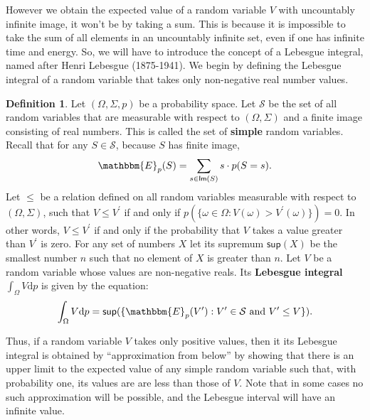 \documentclass[11pt]{article}
\theoremstyle{definition}
\newtheorem{definition}[theorem]{Definition}
\theoremstyle{remark}
\begin{document}
However we obtain the expected value of a random variable $V$ with uncountably infinite image, it won't be by taking a sum. This is because it is impossible to take the sum of all elements in an uncountably infinite set, even if one has infinite time and energy. So, we will have to introduce the concept of a Lebesgue integral, named after Henri Lebesgue (1875-1941). We begin by defining the Lebesgue integral of a random variable that takes only non-negative real number values.
\begin{definition}
    Let $(\Omega,\Sigma,p)$ be a probability space. Let $\mathcal{S}$ be the set of all random variables that are measurable with respect to $(\Omega,\Sigma)$ and a finite image consisting of real numbers. This is called the set of \textbf{simple} random variables. Recall that for any $S\in\mathcal{S}$, because $S$ has finite image,
    $$\mathbbm{E}_{p}(S)=\sum_{s\in\textsf{Im}(S)}s\cdot p(S=s).$$
    Let $\leq$ be a relation defined on all random variables measurable with respect to $(\Omega,\Sigma)$, such that $V\leq V^{\prime}$ if and only if $p(\{\omega\in \Omega:V(\omega)>V^{\prime}(\omega)\})=0$. In other words, $V\leq V^{\prime}$ if and only if the probability that $V$ takes a value greater than $V^{\prime}$ is zero. For any set of numbers $X$ let its supremum $\textsf{sup}(X)$ be the smallest number $n$ such that no element of $X$ is greater than $n$. Let $V$ be a random variable whose values are non-negative reals. Its \textbf{Lebesgue integral} $\int_{\Omega}V\textrm{d}p$ is given by the equation:
    $$\int_{\Omega}V\textrm{d}p = \textsf{sup}(\{\mathbbm{E}_{p}(V^{\prime}):V^{\prime}\in \mathcal{S} \ \text{and} \ V^{\prime}\leq V\}).$$
\end{definition}
\noindent
Thus, if a random variable $V$ takes only positive values, then it its Lebesgue integral is obtained by ``approximation from below'' by showing that there is an upper limit to the expected value of any simple random variable such that, with probability one, its values are are less than those of $V$. Note that in some cases no such approximation will be possible, and the Lebesgue interval will have an infinite value.\par
\end{document}
